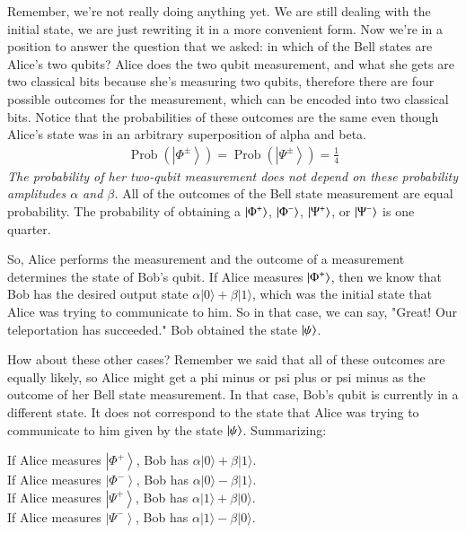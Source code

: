 Remember, we're not really doing anything yet.  We are still dealing with the initial state, we are just rewriting it in a more convenient form. Now we're in a position to answer the question that we asked: in which of the Bell states are Alice's two qubits? Alice does the two qubit measurement, and what she gets are two classical bits because she's measuring two qubits, therefore there are four possible outcomes for the measurement, which can be encoded into two classical bits. Notice that the probabilities of these outcomes are the same even though Alice's state was in an arbitrary superposition of alpha and beta.
\begin{align}
\operatorname{Prob}\left(\left|\Phi^{\pm}\right\rangle\right)=\operatorname{Prob}\left(\left|\Psi^{\pm}\right\rangle\right)=\frac{1}{4}
\end{align}
\emph{The probability of her two-qubit measurement does not depend on these probability amplitudes $\alpha$ and $\beta$.} All of the outcomes of the Bell state measurement are equal probability. The probability of obtaining a $\left| \Phi^+ \right\rangle$, $\left| \Phi^- \right\rangle$, $\left| \Psi^+ \right\rangle$, or $\left| \Psi^- \right\rangle$ is one quarter.

So, Alice performs the measurement and the outcome of a measurement determines the state of Bob's qubit. If Alice measures $\left| \Phi^+ \right\rangle$, then we know that Bob has the desired output state $\alpha|0\rangle+\beta|1\rangle$, which was the initial state that Alice was trying to communicate to him. So in that case, we can say, "Great! Our teleportation has succeeded." Bob obtained the state $\left| \psi \right\rangle$.

How about these other cases? Remember we said that all of these outcomes are equally likely, so Alice might get a phi minus or psi plus or psi minus as the outcome of her Bell state measurement. In that case, Bob's qubit is currently in a different state. It does not correspond to the state that Alice was trying to communicate to him given by the state $\left| \psi \right\rangle$.  Summarizing:

\noindent
If Alice measures $\left|\Phi^{+}\right\rangle$, Bob has $\alpha|0\rangle+\beta|1\rangle$.\\
If Alice measures $\left|\Phi^{-}\right\rangle$, Bob has $\alpha|0\rangle-\beta|1\rangle$.\\
If Alice measures $\left|\Psi^{+}\right\rangle$, Bob has $\alpha|1\rangle+\beta|0\rangle$.\\
If Alice measures $\left|\Psi^{-}\right\rangle$, Bob has $\alpha|1\rangle-\beta|0\rangle$.

